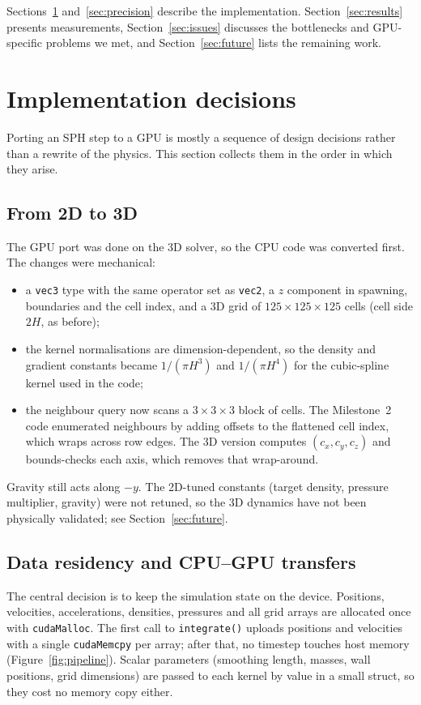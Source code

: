 \documentclass[11pt]{article}
\begin{document}
Sections~\ref{sec:decisions} and~\ref{sec:precision} describe the implementation. Section~\ref{sec:results} presents measurements, Section~\ref{sec:issues} discusses the bottlenecks and GPU-specific problems we met, and Section~\ref{sec:future} lists the remaining work.

\section{Implementation decisions}\label{sec:decisions}

Porting an SPH step to a GPU is mostly a sequence of design decisions rather than a rewrite of the physics. This section collects them in the order in which they arise.

\subsection{From 2D to 3D}

The GPU port was done on the 3D solver, so the CPU code was converted first. The changes were mechanical:
\begin{itemize}
\item a \texttt{vec3} type with the same operator set as \texttt{vec2}, a $z$ component in spawning, boundaries and the cell index, and a 3D grid of $125\times125\times125$ cells (cell side $2H$, as before);
\item the kernel normalisations are dimension-dependent, so the density and gradient constants became $1/(\pi H^3)$ and $1/(\pi H^4)$ for the cubic-spline kernel used in the code;
\item the neighbour query now scans a $3\times3\times3$ block of cells. The Milestone~2 code enumerated neighbours by adding offsets to the flattened cell index, which wraps across row edges. The 3D version computes $(c_x,c_y,c_z)$ and bounds-checks each axis, which removes that wrap-around.
\end{itemize}
Gravity still acts along $-y$. The 2D-tuned constants (target density, pressure multiplier, gravity) were not retuned, so the 3D dynamics have not been physically validated; see Section~\ref{sec:future}.

\subsection{Data residency and CPU--GPU transfers}\label{sec:residency}

The central decision is to keep the simulation state on the device. Positions, velocities, accelerations, densities, pressures and all grid arrays are allocated once with \texttt{cudaMalloc}. The first call to \texttt{integrate()} uploads positions and velocities with a single \texttt{cudaMemcpy} per array; after that, no timestep touches host memory (Figure~\ref{fig:pipeline}). Scalar parameters (smoothing length, masses, wall positions, grid dimensions) are passed to each kernel by value in a small struct, so they cost no memory copy either.
\end{document}
